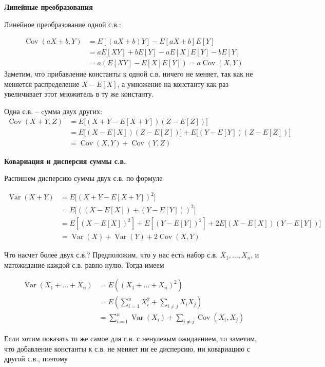 \documentclass[12pt]{article}
\DeclareMathOperator{\Var}{Var}
\DeclareMathOperator{\Cov}{Cov}
\begin{document}
\textbf{Линейные преобразования}

Линейное преобразование одной с.в.:

\begin{align*}
  \Cov(aX + b, Y) &= E[(aX + b)Y] - E[aX + b]E[Y] \\
                  &= aE[XY] +bE[Y] - aE[X]E[Y] - bE[Y]\\
                  &= a(E[XY] - E[X]E[Y]) = a \Cov(X, Y) 
\end{align*}
Заметим, что прибавление константы к одной с.в. ничего не меняет, так как не меняется распределение $X - E[X]$, а умножение на константу как раз увеличивает этот множитель в ту же константу.


Одна с.в. -- cумма двух других:
\begin{align*}
  \Cov(X + Y, Z) &= E\bigg[(X + Y - E[X + Y])(Z - E[Z])\bigg] \\
                 &= E\bigg[(X - E[X])(Z - E[Z])\bigg] + E\bigg[(Y - E[Y])(Z - E[Z]) \bigg] \\
                 &= \Cov(X, Y) + \Cov(Y, Z)
\end{align*}


\textbf{Ковариация и дисперсия суммы с.в.}

Распишем дисперсию суммы двух с.в. по формуле

\begin{align*}
  \Var(X + Y) &= E\bigg[(X + Y - E[X + Y])^2\bigg] \\ 
              &= E\bigg[((X - E[X]) + (Y - E[Y]))^2\bigg] \\
              &= E[(X - E[X])^2] + E[(Y - E[Y])^2] + 2E\bigg[(X - E[X]) (Y - E[Y])\bigg] \\
              &= \Var(X) + \Var(Y) + 2\Cov(X, Y)
\end{align*}

Что насчет более двух с.в.? Предположим, что у нас есть набор с.в. $X_1, \dots, X_n$, и матожидание каждой с.в. равно нулю. Тогда имеем

\begin{align*}
  \Var(X_1 + \dots +X_n) &= E((X_1 + \dots + X_n)^2) \\
                         &= E\left(\sum_{i = 1}^n X_i^2 + \sum_{i \ne j} X_i X_j \right) \\
                         &= \sum_{i = 1}^n \Var(X_i) + \sum_{i \ne j} \Cov(X_i, X_j)
\end{align*}

Если хотим показать то же самое для с.в. с ненулевым ожидаением, то заметим, что добавление константы к с.в. не меняет ни ее дисперсию, ни ковариацию с другой с.в., поэтому
\end{document}

